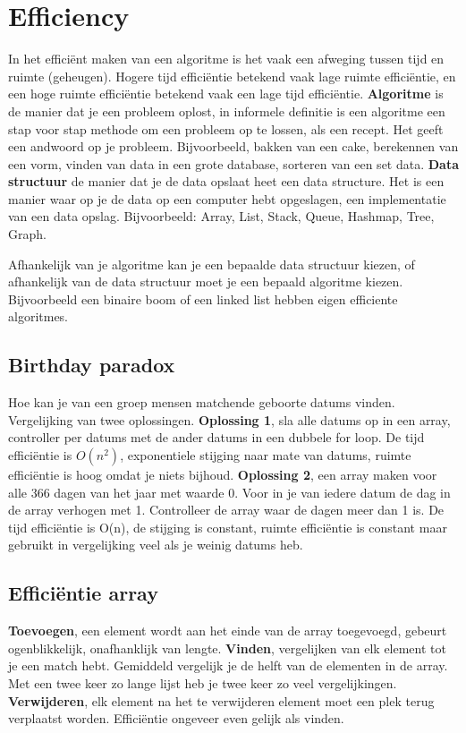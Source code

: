 \section{Efficiency}
In het efficiënt maken van een algoritme is het vaak een afweging tussen tijd en ruimte (geheugen).
Hogere tijd efficiëntie betekend vaak lage ruimte efficiëntie, en een hoge ruimte efficiëntie betekend vaak een lage tijd efficiëntie.
\textbf{Algoritme} is de manier dat je een probleem oplost, in informele definitie is een algoritme een stap voor stap methode om een probleem op te lossen, als een recept. Het geeft een andwoord op je probleem. Bijvoorbeeld, bakken van een cake, berekennen van een vorm, vinden van data in een grote database, sorteren van een set data.
\textbf{Data structuur} de manier dat je de data opslaat heet een data structure.
Het is een manier waar op je de data op een computer hebt opgeslagen, een implementatie van een data opslag.
Bijvoorbeeld: Array, List, Stack, Queue, Hashmap, Tree, Graph.

Afhankelijk van je algoritme kan je een bepaalde data structuur kiezen, of afhankelijk van de data structuur moet je een bepaald algoritme kiezen.
Bijvoorbeeld een binaire boom of een linked list hebben eigen efficiente algoritmes.

\subsection{Birthday paradox}
Hoe kan je van een groep mensen matchende geboorte datums vinden.
Vergelijking van twee oplossingen.
\textbf{Oplossing 1}, sla alle datums op in een array, controller per datums met de ander datums in een dubbele for loop.
De tijd efficiëntie is $O(n^2)$, exponentiele stijging naar mate van datums, ruimte efficiëntie is hoog omdat je niets bijhoud.
\textbf{Oplossing 2}, een array maken voor alle 366 dagen van het jaar met waarde 0.
Voor in je van iedere datum de dag in de array verhogen met 1.
Controlleer de array waar de dagen meer dan 1 is.
De tijd efficiëntie is O(n), de stijging is constant, ruimte efficiëntie is constant maar gebruikt in vergelijking veel als je weinig datums heb.

\subsection{Efficiëntie array}
\textbf{Toevoegen}, een element wordt aan het einde van de array toegevoegd, gebeurt ogenblikkelijk, onafhanklijk van lengte.
\textbf{Vinden}, vergelijken van elk element tot je een match hebt.
Gemiddeld vergelijk je de helft van de elementen in de array.
Met een twee keer zo lange lijst heb je twee keer zo veel vergelijkingen.
\textbf{Verwijderen}, elk element na het te verwijderen element moet een plek terug verplaatst worden.
Efficiëntie ongeveer even gelijk als vinden.


